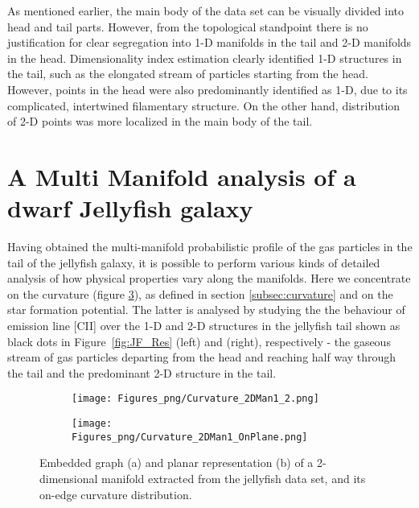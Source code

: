 As mentioned earlier, the main body of the data set can be visually divided into head and tail parts.
However, from the topological standpoint there is no justification for clear segregation into 1-D manifolds in the tail and 2-D manifolds in the head.
Dimensionality index estimation clearly identified 1-D structures in the tail, such as the elongated stream of particles starting from the head.
However, points in the head were also predominantly identified as 1-D, due to its complicated, intertwined filamentary structure.
On the other hand, distribution of 2-D points was more localized in the main body of the tail.


\section{A Multi Manifold analysis of a dwarf Jellyfish galaxy}\label{sec:manifold_jellyfish}

Having obtained the multi-manifold probabilistic profile of the gas particles in the tail of the jellyfish galaxy, 
it is possible to perform various kinds of detailed analysis of how physical properties vary along the manifolds.
Here we concentrate on the curvature (figure \ref{fig:curvatureJF}), as defined in section \ref{subsec:curvature} and on the star formation potential.
The latter is analysed by studying the the behaviour of emission line [CII] over the 1-D and 2-D structures
in the jellyfish tail shown as black dots in Figure~\ref{fig:JF_Res} (left) and (right), respectively
- the gaseous stream of gas particles departing from the head and reaching half way through the tail and the predominant 2-D structure in the tail.
\begin{figure}[ht]
\centering
\begin{subfigure}[t]{0.49\textwidth}
 \caption{}
 \label{subfig:CurvJF}
 \texttt{[image: Figures\_png/Curvature\_2DMan1\_2.png]}
\end{subfigure}
\begin{subfigure}[t]{0.49\textwidth}
 \caption{}
 \label{subfig:CurvJF_Plane}
 \texttt{[image: Figures\_png/Curvature\_2DMan1\_OnPlane.png]}
\end{subfigure}
\caption{Embedded graph (a) and planar representation (b) of a 2-dimensional manifold extracted from the jellyfish data set, and its on-edge curvature distribution.}
\label{fig:curvatureJF}
\end{figure}

